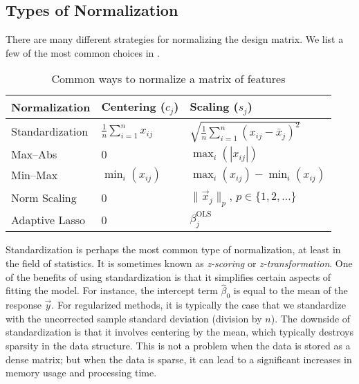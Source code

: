 \subsection{Types of Normalization}

There are many different strategies for normalizing the design matrix.
We list a few of the most common choices in .

\begin{table}[hbt]
  \centering
  \caption{Common ways to normalize a matrix of features}
  \label{tab:normalization-types}
  \begin{tabular}{lll}
    \toprule
    Normalization   & Centering (\(c_{j}\))              & Scaling (\(s_j\))                                         \\
    \midrule
    Standardization & \(\frac{1}{n}\sum_{i=1}^n x_{ij}\) & \(\sqrt{\frac{1}{n}\sum_{i=1}^n (x_{ij} - \bar{x}_j)^2}\) \\
    \addlinespace
    Max--Abs        & 0                                  & \(\max_i(|x_{ij}|)\)                                      \\
    \addlinespace
    Min--Max        & \(\min_i(x_{ij})\)                 & \(\max_i(x_{ij}) - \min_i(x_{ij})\)                       \\
    \addlinespace
    Norm Scaling    & 0                                  & \(\lVert \vec{x}_j\rVert_p\), \(p \in \{1,2,\dots\}\)     \\
    \addlinespace
    Adaptive Lasso  & 0                                  & \(\beta_j^\text{OLS}\)                                    \\
    \bottomrule
  \end{tabular}
\end{table}

Standardization is perhaps the most common type of normalization, at least in the field of statistics. It is sometimes known as \emph{z-scoring} or \emph{z-transformation}. One of the benefits of using standardization is that it simplifies certain aspects of fitting the model. For instance, the intercept term \(\hat\beta_0\) is equal to the mean of the response \(\vec y\).
For regularized methods, it is typically the case that we standardize with the uncorrected sample standard deviation (division by \(n\)). The downside of standardization is that it involves centering by the mean, which typically destroys sparsity in the data structure. This is not a problem when the data is stored as a dense matrix; but when the data is sparse, it can lead to a significant increases in memory usage and processing time.

